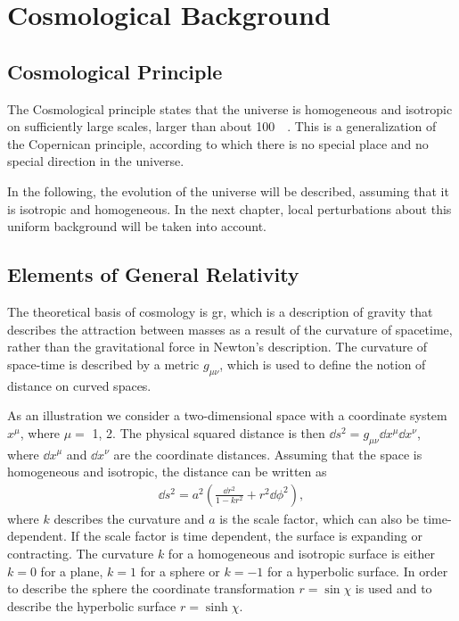 \chapter{Cosmological Background}
\label{ch:cosmological-background}

\section{Cosmological Principle}
The Cosmological principle states that the universe is homogeneous and isotropic on sufficiently large scales, larger than about \SI{100}{\mega\parsec}.
This is a generalization of the Copernican principle, according to which there is no special place and no special direction in the universe.

In the following, the evolution of the universe will be described, assuming that it is isotropic and homogeneous.
In the next chapter, local perturbations about this uniform background will be taken into account.


\section{Elements of General Relativity}
\label{sec:general-relativity}
The theoretical basis of cosmology is \ac{gr}, which is a description of gravity that describes the attraction between masses as a result of the curvature of spacetime, rather than the gravitational force in Newton's description. The curvature of space-time is described by a metric $g_{\mu\nu}$, which is used to define the notion of distance on curved spaces.


As an illustration we consider a two-dimensional space with a coordinate system $x^\mu$, where $\mu =$ 1, 2.
The physical squared distance is then $\dd{s}^2 = g_{\mu\nu} \dd{x}^{\mu} \dd{x}^{\nu}$, where $\dd{x}^{\mu}$ and $\dd{x}^{\nu}$ are the coordinate distances.
Assuming that the space is homogeneous and isotropic, the distance can be written as
\begin{align*}
	\dd{s}^2 = a^2 \left(\frac{\dd{r}^2}{1-kr^2} + r^2 \dd{\phi}^2\right),
\end{align*}
where $k$ describes the curvature and $a$ is the scale factor, which can also be time-dependent.
If the scale factor is time dependent, the surface is expanding or contracting.
The curvature $k$ for a homogeneous and isotropic surface is either $k = 0$ for a plane, $k = 1$ for a sphere or $k = -1$ for a hyperbolic surface.
In order to describe the sphere the coordinate transformation $r = \sin\chi$ is used and to describe the hyperbolic surface $r = \sinh\chi$.


